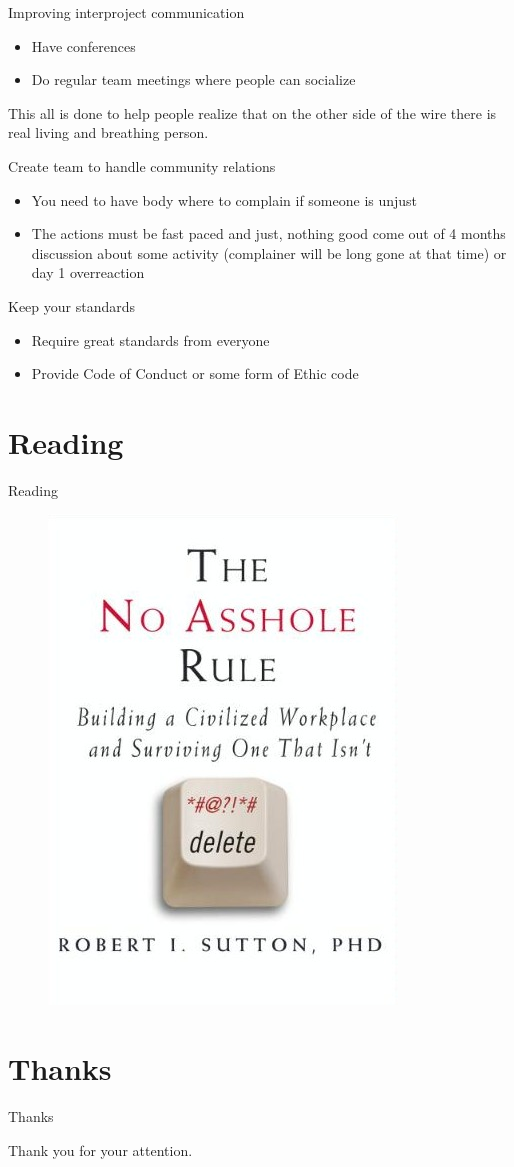 \documentclass{beamer}
\begin{document}
\begin{frame}[t]{Improving interproject communication}
	\begin{itemize}
	\item Have conferences
	\item Do regular team meetings where people can socialize
	\end{itemize}
	\vspace{0.8cm}
	\begin{center}
	This all is done to help people realize that on the other side of the wire there is real living and breathing person.
	\end{center}
\end{frame}

\begin{frame}[t]{Create team to handle community relations}
	\begin{itemize}
	\item You need to have body where to complain if someone is unjust
	\item The actions must be fast paced and just, nothing good come out of 4 months discussion about some activity (complainer will be long gone at that time) or day 1 overreaction
	\end{itemize}
\end{frame}

\begin{frame}[t]{Keep your standards}
	\begin{itemize}
	\item Require great standards from everyone
	\item Provide Code of Conduct or some form of Ethic code
	\end{itemize}
\end{frame}

\section{Reading}

\begin{frame}{Reading}
	\begin{figure}
	\includegraphics[width= 0.4\linewidth]{The_No_Asshole_Rule.jpg}
	\end{figure}
\end{frame}

\section{Thanks}

\begin{frame}{Thanks}
	\begin{center}
	Thank you for your attention.
	\end{center}
\end{frame}
\end{document}
